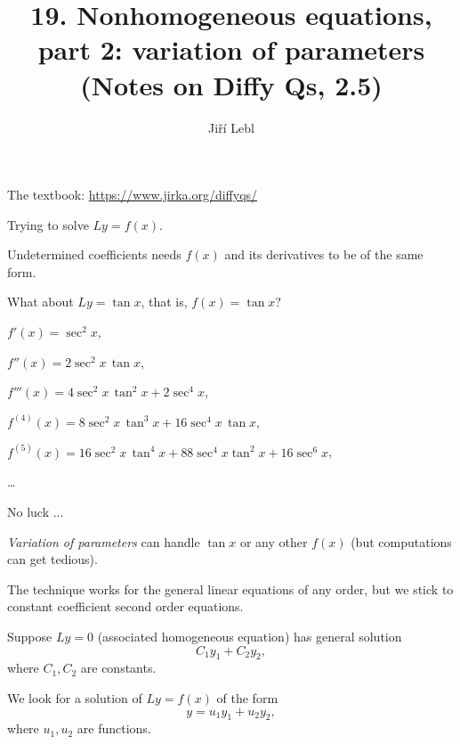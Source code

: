 \documentclass[10pt,aspectratio=169]{beamer}
\author{Ji\v{r}\'i Lebl}
\institute[OSU]{%
Oklahoma State University%
}
\title{19. Nonhomogeneous equations,\\part 2: variation of parameters\\(Notes on Diffy Qs, 2.5)}
\date{}
\begin{document}
\begin{frame}
\titlepage


\begin{center}
The textbook: \url{https://www.jirka.org/diffyqs/}
\end{center}
\end{frame}

\begin{frame}
Trying to solve $Ly = f(x)$.

\medskip

Undetermined coefficients needs $f(x)$ and its derivatives
to be of the same form.

\medskip
\pause

What about $Ly = \tan x$, that is, $f(x) = \tan x$?

\medskip
\pause

$f'(x) = \sec^2 x$,

\pause
$f''(x) = 2\sec^2 x \, \tan x$,

\pause
$f'''(x) = 4 \sec^2 x \, \tan^2 x + 2 \sec^4 x$,

\pause
$f^{(4)}(x) = 8 \sec^2 x \, \tan^3 x + 16 \sec^4 x \, \tan x$,

\pause
$f^{(5)}(x) = 16\sec^2 x \, \tan^4 x + 88 \sec^4 x \tan^2 x + 16 \sec^6 x$,

\ldots

\medskip
\pause

No luck ...

\end{frame}

\begin{frame}
\emph{Variation of parameters} can handle $\tan x$ or any other $f(x)$ (but
computations can get tedious).

\medskip
\pause

The technique works for the general linear equations of any order,
but we stick to constant coefficient second order equations.

\medskip
\pause

Suppose $Ly= 0$ (associated homogeneous equation) has general
solution
\[
C_1 y_1 + C_2 y_2 ,
\]
where $C_1,C_2$ are constants.

\medskip
\pause

We look for a solution of $Ly=f(x)$ of the form
\[
y  = u_1 y_1 + u_2 y_2 ,
\]
where $u_1,u_2$ are functions.

\end{frame}
\end{document}
